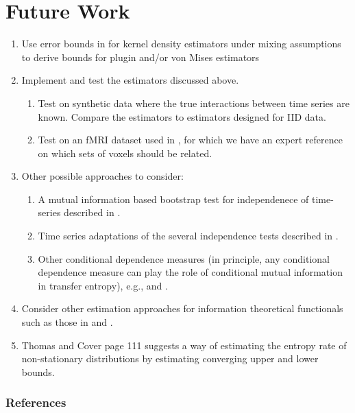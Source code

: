\documentclass{article} %
\begin{document}
\section{Future Work}
\begin{enumerate}
\item Use error bounds in \cite{fan03timeSeries} for kernel density estimators
under mixing assumptions to derive bounds for plugin and/or von Mises
estimators
\item Implement and test the estimators discussed above.
\begin{enumerate}
\item Test on synthetic data where the true interactions between time series
are known. Compare the estimators to estimators designed for IID data.
\item Test on an fMRI dataset used in \cite{clute14OHBM}, for which we have an
expert reference on which sets of voxels should be related.
\end{enumerate}
\item Other possible approaches to consider:
\begin{enumerate}
\item A mutual information based bootstrap test for independenece of
time-series described in \cite{wu09bootstrapMI}.
\item Time series adaptations of the several independence tests described in
\citep{gretton10nonparametricIndependence}.
\item Other conditional dependence measures (in principle, any conditional
dependence measure can play the role of conditional mutual information in
transfer entropy), e.g., \citep{bergsma10nonparametric} and
\citep{zhang12kernel}.
\end{enumerate}
\item Consider other estimation approaches for information theoretical
functionals such as those in \cite{moon14ensemble} and
\cite{singh14densityfunc}.
\item Thomas and Cover page 111 suggests a way of estimating the entropy rate
of non-stationary distributions by estimating converging upper and lower
bounds.
\end{enumerate}

\subsubsection*{References}
\setlength{\bibsep}{0.0pt}
{


}
\end{document}
